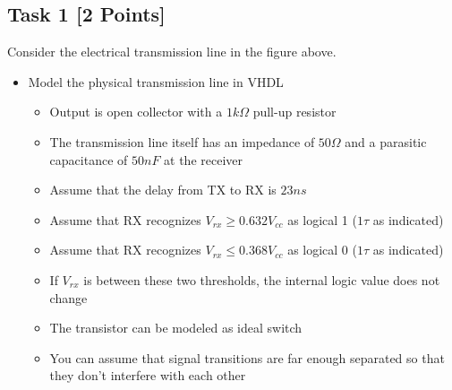 \documentclass[12pt,epsf,makeidx,oneside]{book}
\begin{document}
\subsection{Task 1 [2 Points]}
Consider the electrical transmission line in the figure above.
\begin{itemize}[noitemsep]
  \item Model the physical transmission line in VHDL
  \begin{itemize}[noitemsep]
    \item Output is open collector with a $1k\Omega $ pull-up resistor
    \item The transmission line itself has an impedance of $50\Omega$ and a parasitic capacitance of $50nF$ at the receiver
    \item Assume that the delay from TX to RX is $23ns$
    \item Assume that RX recognizes $V_{rx}\ge0.632V_{cc}$ as logical 1 ($1\tau$ as indicated)
    \item Assume that RX recognizes $V_{rx}\le0.368V_{cc}$ as logical 0 ($1\tau$ as indicated)
    \item If $V_{rx}$ is between these two thresholds, the internal logic value does not change
    \item The transistor can be modeled as ideal switch
    \item You can assume that signal transitions are far enough separated so that they don't interfere with each other
  \end{itemize}
\end{itemize}
\end{document}
